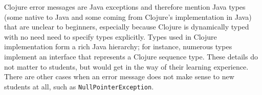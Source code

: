 \documentclass[submission,copyright,creativecommons]{eptcs}
\newcommand{\allcomments}[1]{{#1}}
\newcommand{\elenacomment}[1]{{\bf \textcolor{ForestGreen}{\allcomments{{#1}}}}}
\newcommand{\stephencomment}[1]{{\bf \color{StephensBlue}{\allcomments{{#1}}}}} %
\newcommand{\joecomment}[1]{{\bf \color{JoesGold}{\allcomments{{#1}}}}}
\begin{document}
Clojure error messages are Java exceptions and therefore mention Java types (some native to Java and some coming from Clojure's implementation in Java) that are unclear to beginners, especially because Clojure is dynamically typed with no need need to specify types explicitly. 
Types used in Clojure implementation form a rich Java hierarchy; for instance, numerous types implement an interface that represents a Clojure sequence type. 
These details do not matter to students, but would get in the way of their learning experience. There are other cases when an error message does not make sense to new students at all, such as {\tt NullPointerException}. 
\end{document}
